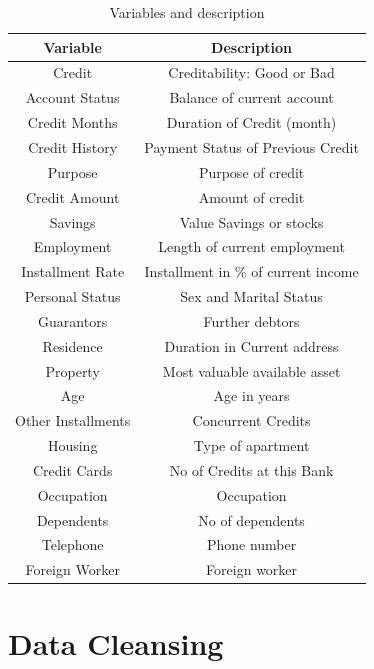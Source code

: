 \documentclass[sigconf]{acmart}
\begin{document}
\begin{table}
  \caption{Variables and description
  \cite{psu-site}}
  \label{tab:table1}
  \begin{tabular}{cc}
    \toprule
     Variable& Description\\
    \midrule
    Credit& Creditability: Good or Bad\\
    Account Status& Balance of current account\\
    Credit Months& Duration of Credit (month)\\
    Credit History& Payment Status of Previous Credit\\
    Purpose& Purpose of credit\\
    Credit Amount& Amount of credit\\
    Savings& Value Savings or stocks\\
    Employment& Length of current employment\\
    Installment Rate& Installment in \% of current income\\
    Personal Status& Sex and Marital Status\\
    Guarantors& Further debtors\\
    Residence& Duration in Current address\\
    Property& Most valuable available asset\\
    Age& Age in years\\
    Other Installments& Concurrent Credits\\
    Housing& Type of apartment\\
    Credit Cards& No of Credits at this Bank\\
    Occupation& Occupation\\
    Dependents& No of dependents\\
    Telephone& Phone number\\
    Foreign Worker& Foreign worker\\
    \bottomrule
  \end{tabular}
\end{table}

\section{Data Cleansing}
\end{document}
